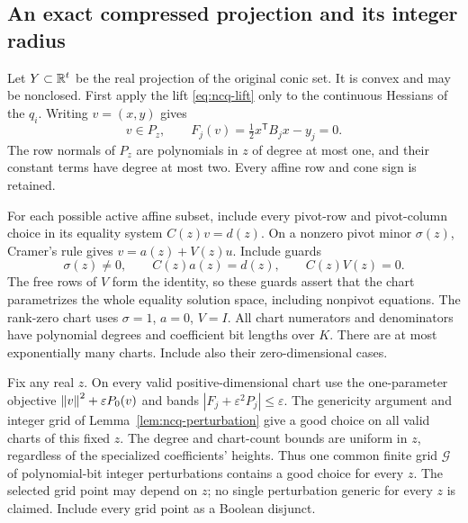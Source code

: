 \subsection{An exact compressed projection and its integer radius}
\label{app:cone-projection}

Let $Y\subset\mathbb R^t$ be the real projection of the original conic set.
It is convex and may be nonclosed. First apply the lift
\eqref{eq:ncq-lift} only to the continuous Hessians of the $q_i$. Writing
$v=(x,y)$ gives
\begin{equation}
\label{eq:cone-fiber-lift}
 v\in P_z,\qquad F_j(v)=\tfrac12x^{\mathsf T}B_jx-y_j=0.
\end{equation}
The row normals of $P_z$ are polynomials in $z$ of degree at most one,
and their constant terms have degree at most two. Every affine row and
cone sign is retained.

For each possible active affine subset, include every pivot-row and
pivot-column choice in its equality system $C(z)v=d(z)$. On a nonzero
pivot minor $\sigma(z)$, Cramer's rule gives
$v=a(z)+V(z)u$. Include guards
\begin{equation}
\label{eq:cone-chart-guards}
 \sigma(z)\ne0,\qquad C(z)a(z)=d(z),\qquad C(z)V(z)=0.
\end{equation}
The free rows of $V$ form the identity, so these guards assert that the
chart parametrizes the whole equality solution space, including nonpivot
equations. The rank-zero chart uses $\sigma=1$, $a=0$, $V=I$.
All chart numerators and denominators have polynomial degrees and
coefficient bit lengths over $K$. There are at most exponentially many
charts. Include also their zero-dimensional cases.

Fix any real $z$. On every valid positive-dimensional chart use the
one-parameter objective $\left\lVert v\right\rVert^2+\varepsilon P_0(v)$ and bands
$|F_j+\varepsilon^2P_j|\le\varepsilon$. The genericity argument and
integer grid of Lemma~\ref{lem:ncq-perturbation} give a good choice on
all valid charts of this fixed $z$. The degree and chart-count bounds
are uniform in $z$, regardless of the specialized coefficients' heights.
Thus one common finite grid $\mathcal G$ of polynomial-bit integer
perturbations contains a good choice for every $z$. The selected grid
point may depend on $z$; no single perturbation generic for every $z$
is claimed. Include every grid point as a Boolean disjunct.

